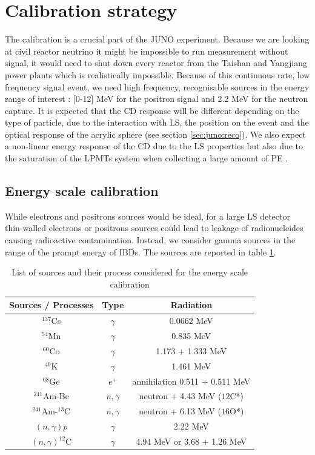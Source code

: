 \section{Calibration strategy}
\label{sec:juno:calib}

The calibration is a crucial part of the JUNO experiment. Because we are looking at civil reactor neutrino it might be impossible to run measurement without signal, it would need to shut down every reactor from the Taishan and Yangjiang power plants which is realistically impossible. Because of this continuous rate, low frequency signal event, we need high frequency, recognisable sources in the energy range of interest : [0-12] MeV for the positron signal and 2.2 MeV for the neutron capture.
It is expected that the CD response will be different depending on the type of particle, due to the interaction with LS, the position on the event and the optical response of the acrylic sphere (see section \ref{sec:juno:reco}).
We also expect a non-linear energy response of the CD due to the LS properties \cite{bay_optimization_2020} but also due to the saturation of the LPMTs system when collecting a large amount of PE \cite{han_dual_2021}.

\subsection{Energy scale calibration}

While electrons and positrons sources would be ideal, for a large LS detector thin-walled electrons or positrons sources could lead to leakage of radionucleides causing radioactive contamination. Instead, we consider gamma sources in the range of the prompt energy of IBDs. The sources are reported in table \ref{tab:juno:calib_source}.

\begin{table}[ht]
  \centering
  \begin{tabular}{|c|c|c|}
    \hline
    Sources / Processes & Type & Radiation \\
    \hline
    $^{137}$Cs          & $\gamma$ & 0.0662 MeV \\
    $^{54}$Mn           & $\gamma$ & 0.835 MeV \\
    $^{60}$Co           & $\gamma$ & 1.173 + 1.333 MeV \\
    $^{40}$K            & $\gamma$ & 1.461 MeV \\
    $^{68}$Ge           & $e^{+}$  &  annihilation 0.511 + 0.511 MeV \\
    $^{241}$Am-Be       & $n,\gamma$ & neutron + 4.43 MeV (${12}$C*) \\
    $^{241}$Am-$^{13}$C & $n,\gamma$ & neutron + 6.13 MeV (${16}$O*) \\
    $(n, \gamma)p$      & $\gamma$ & 2.22 MeV \\
    $(n, \gamma)^{12}$C & $\gamma$ & 4.94 MeV or 3.68 + 1.26 MeV \\
    \hline
  \end{tabular}
  \caption{List of sources and their process considered for the energy scale calibration}
  \label{tab:juno:calib_source}
\end{table}

